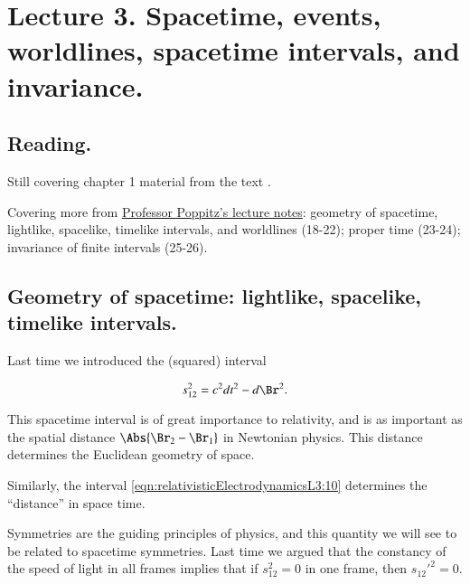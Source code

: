 %
%

\chapter{Lecture 3.  Spacetime, events, worldlines, spacetime intervals, and invariance.}
\label{chap:relativisticElectrodynamicsL3}
{}
\date{Jan 13, 2011}

\beginArtNoToc

\section{Reading.}

Still covering chapter 1 material from the text \cite{landau1980classical}.

Covering more from \href{http://www.physics.utoronto.ca/~poppitz/e-poppitz/PHY450_files/RelEM12-26.pdf}{Professor Poppitz's lecture notes}: geometry of spacetime, lightlike, spacelike, timelike intervals, and worldlines (18-22); proper time (23-24); invariance of finite intervals (25-26).

\section{Geometry of spacetime: lightlike, spacelike, timelike intervals.}

Last time we introduced the (squared) interval

\begin{equation}\label{eqn:relativisticElectrodynamicsL3:10}
s_{12}^2 = c^2 dt^2 - d\Br^2.
\end{equation}

This spacetime interval is of great importance to relativity, and is as important as the spatial distance $\Abs{\Br_2 -\Br_1}$ in Newtonian physics.  This distance determines the Euclidean geometry of space.

Similarly, the interval \ref{eqn:relativisticElectrodynamicsL3:10} determines the ``distance'' in space time.

Symmetries are the guiding principles of physics, and this quantity we will see to be related to spacetime symmetries.  Last time we argued that the constancy of the speed of light in all frames implies that if $s_{12}^2 = 0$ in one frame, then ${s_{12}'}^2 = 0$.


